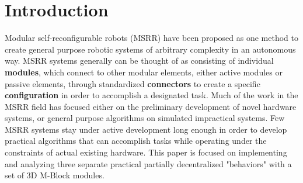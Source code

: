 \section{Introduction}
\label{sec:Introduction}

Modular self-reconfigurable robots (MSRR) have been proposed as one method to create general purpose robotic systems of arbitrary complexity in an autonomous way. MSRR systems generally can be thought of as consisting of individual \textbf{modules}, which connect to other modular elements, either active modules or passive elements, through standardized \textbf{connectors} to create a specific \textbf{configuration} in order to accomplish a designated task. Much of the work in the MSRR field has focused either on the preliminary development of novel hardware systems, or general purpose algorithms on simulated impractical systems. Few MSRR systems stay under active development long enough in order to develop practical algorithms that can accomplish tasks while operating under the constraints of actual existing hardware. This paper is focused on implementing and analyzing three separate practical partially decentralized "behaviors" with a set of 3D M-Block modules.

